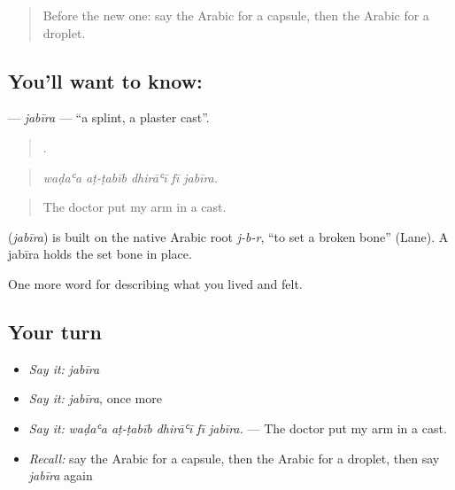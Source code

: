 \label{lesson:AR-C511-jabira}



\begin{quote}
Before the new one: say the Arabic for a capsule, then the Arabic for a droplet.
\end{quote}

\subsection*{You'll want to know: }
\textbf{} — \emph{jabīra} — \textquotedblleft{}a splint, a plaster cast\textquotedblright{}.

\begin{quote}
    .
\end{quote}

\begin{quote}
\emph{waḍaʿa aṭ-ṭabīb dhirāʿī fī jabīra.}
\end{quote}

\begin{quote}
The doctor put my arm in a cast.
\end{quote}

\begin{cousinweb}
\textbf{} (\emph{jabīra}) is built on the native Arabic root \emph{j-b-r}, \textquotedblleft{}to set a broken bone\textquotedblright{} (Lane). A jabīra holds the set bone in place.
\end{cousinweb}

\begin{grammarlens}[title={What you've built}]
One more word for describing what you lived and felt.
\end{grammarlens}

\subsection*{Your turn}
\begin{itemize}
\raggedright
  \item \emph{Say it:} \emph{jabīra}
  \item \emph{Say it:} \emph{jabīra}, once more
  \item \emph{Say it:} \emph{waḍaʿa aṭ-ṭabīb dhirāʿī fī jabīra.} — The doctor put my arm in a cast.
  \item \emph{Recall:} say the Arabic for a capsule, then the Arabic for a droplet, then say \emph{jabīra} again
\end{itemize}

